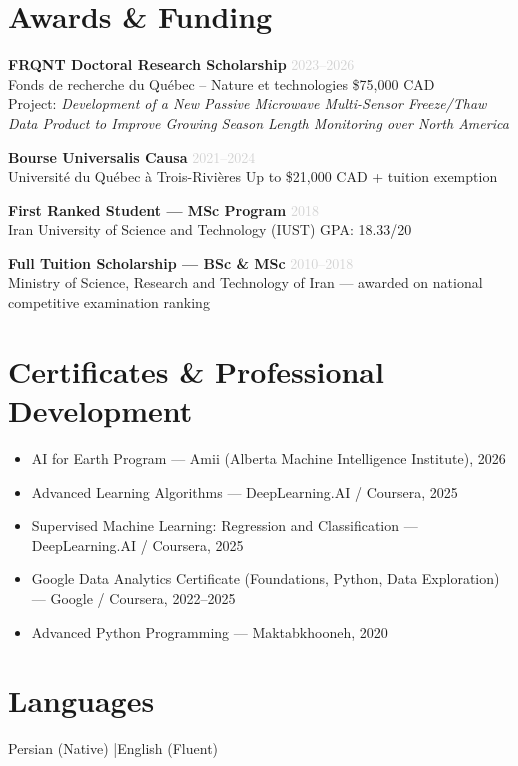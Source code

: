 \documentclass[10pt, a4paper]{article}
\newcommand{\dategray}[1]{\textcolor{lightgray}{\small #1}}
\begin{document}
\section{Awards \& Funding}

\noindent\textbf{FRQNT Doctoral Research Scholarship} \hfill \dategray{2023–2026}\\
Fonds de recherche du Québec – Nature et technologies \quad \$75,000 CAD\\
Project: \textit{Development of a New Passive Microwave Multi-Sensor Freeze/Thaw
Data Product to Improve Growing Season Length Monitoring over North America}

\vspace{4pt}
\noindent\textbf{Bourse Universalis Causa} \hfill \dategray{2021–2024}\\
Université du Québec à Trois-Rivières \quad Up to \$21,000 CAD + tuition exemption

\vspace{4pt}
\noindent\textbf{First Ranked Student — MSc Program} \hfill \dategray{2018}\\
Iran University of Science and Technology (IUST) \quad GPA: 18.33/20

\vspace{4pt}
\noindent\textbf{Full Tuition Scholarship — BSc \& MSc} \hfill \dategray{2010–2018}\\
Ministry of Science, Research and Technology of Iran — awarded on national
competitive examination ranking

\section{Certificates \& Professional Development}

\begin{itemize}
  \item AI for Earth Program — Amii (Alberta Machine Intelligence Institute), 2026
  \item Advanced Learning Algorithms — DeepLearning.AI / Coursera, 2025
  \item Supervised Machine Learning: Regression and Classification — DeepLearning.AI / Coursera, 2025
  \item Google Data Analytics Certificate (Foundations, Python, Data Exploration) — Google / Coursera, 2022–2025
  \item Advanced Python Programming — Maktabkhooneh, 2020
\end{itemize}

\section{Languages}

Persian (Native) \quad|\quad English (Fluent)

\end{document}
